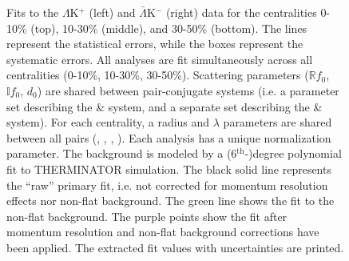 \documentclass[/home/jesse/Analysis/FemtoAnalysis/AnalysisNotes/AnalysisNoteJBuxton.tex]{subfiles}
\renewcommand{\NonFlatBgdLamKch}{_NonFlatBgdCrctnPolynomial}
\renewcommand{\ResNum}{_NoRes}
\renewcommand{\SaveNameModLamKch}{\MomRes\NonFlatBgdLamKch\ResNum\ParamFixAndShareLamKch}
\begin{document}
\begin{landscape}
\begin{figure}[h]
  \centering
  \caption[$\Lambda$K$^{+}$($\bar{\Lambda}$K$^{-}$) Fits, with NO residual correlations included, with No Residuals]{Fits to the $\Lambda$K$^{+}$ (left) and $\bar{\Lambda}$K$^{-}$ (right) data for the centralities 0-10\% (top), 10-30\% (middle), and 30-50\% (bottom).
 The lines represent the statistical errors, while the boxes represent the systematic errors.  
 All \LamKpm analyses are fit simultaneously across all centralities (0-10\%, 10-30\%, 30-50\%).
 Scattering parameters ($\mathbb{R}f_{0}$, $\mathbb{I}f_{0}$, $d_{0}$) are shared between pair-conjugate systems (i.e. a parameter set describing the \LamKchP \& \ALamKchM system, and a separate set describing the \LamKchM \& \ALamKchP system).
 For each centrality, a radius and $\lambda$ parameters are shared between all pairs (\LamKchP, \ALamKchM, \LamKchM, \ALamKchP).
 Each analysis has a unique normalization parameter.
 The background is modeled by a (6$^{\mathrm{th}}$-)degree polynomial fit to THERMINATOR simulation.
 The black solid line represents the ``raw'' primary fit, i.e. not corrected for momentum resolution effects nor non-flat background.  
 The green line shows the fit to the non-flat background.
 The purple points show the fit after momentum resolution and non-flat background corrections have been applied.
 The extracted fit values with uncertainties are printed.}
  \label{fig:LamKchPwConjFits_NoRes}
\end{figure}


\end{landscape}
\end{document}
